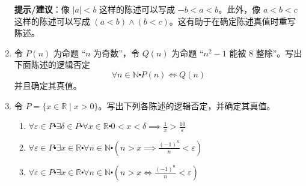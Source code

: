 \begin{enumerate}[label=(\arabic*)]
\begin{enumerate}[label=(\alph*)]
        \end{enumerate}
        \textbf{提示/建议}：像 $|a| < b$ 这样的陈述可以写成 $-b < a < b$。此外，像 $a < b < c$ 这样的陈述可以写成 $(a < b) \land (b < c)$。这有助于在确定陈述真值时重写陈述。
    \item 令 $P(n)$ 为命题 ``$n$ 为奇数''，令 $Q(n)$ 为命题 ``$n^2 - 1$ 能被 $8$ 整除''。写出下面陈述的逻辑否定
        \[\forall n \in \mathbb{N} \centerdot P(n) \iff Q(n)\]
        并且确定其真值。
    \item 令 $P = \{x \in \mathbb{R} \mid x > 0\}$。写出下列各陈述的逻辑否定，并确定其真值。
        \begin{enumerate}[label=(\alph*)]
            \item $\forall \varepsilon \in P \centerdot \exists \delta \in P \centerdot \forall x \in \mathbb{R} \centerdot 0 < x < \delta \implies \frac{1}{x} > \frac{10}{\varepsilon}$
            \item $\forall \varepsilon \in P \centerdot \exists x \in \mathbb{R} \centerdot \forall n \in \mathbb{N} \centerdot (n > x \implies \frac{(-1)^n}{n} < \varepsilon)$
            \item $\forall \varepsilon \in P \centerdot \exists x \in \mathbb{R} \centerdot \forall n \in \mathbb{N} \centerdot (n > x \iff\frac{(-1)^n}{n} < \varepsilon)$
        \end{enumerate}
\end{enumerate}